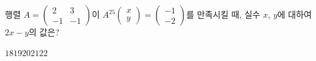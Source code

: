 \hspace*{2mm}\begin{minipage}[t]{\dimexpr\linewidth-2mm\relax}\vspace{0pt}
행렬 $A=\begin{pmatrix} 2 & 3 \\ -1 & -1 \end{pmatrix}$이 $A^{25}\begin{pmatrix} x \\ y \end{pmatrix}=\begin{pmatrix} -1 \\ -2 \end{pmatrix}$를 만족시킬 때, 실수 $x$, $y$에 대하여 $2x-y$의 값은?
\begin{choices32}{$18$}{$19$}{$20$}{$21$}{$22$}\end{choices32}\end{minipage}
